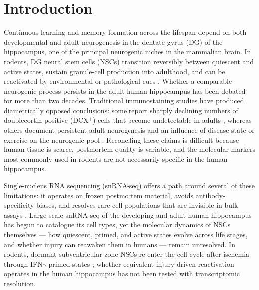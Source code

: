 
\section{Introduction}

Continuous learning and memory formation across the lifespan depend on both developmental and adult neurogenesis in the dentate gyrus (DG) of the hippocampus, one of the principal neurogenic niches in the mammalian brain. In rodents, DG neural stem cells (NSCs) transition reversibly between quiescent and active states, sustain granule-cell production into adulthood, and can be reactivated by environmental or pathological cues \cite{encinas2011division,obernier2019neural,urban2019quiescence}. Whether a comparable neurogenic process persists in the adult human hippocampus has been debated for more than two decades. Traditional immunostaining studies have produced diametrically opposed conclusions: some report sharply declining numbers of doublecortin-positive (DCX$^{+}$) cells that become undetectable in adults \cite{sorrells2018human,cipriani2018hippocampal,franjic2022transcriptomic}, whereas others document persistent adult neurogenesis and an influence of disease state or exercise on the neurogenic pool \cite{boldrini2018human,morenojimenez2019adult,tobin2019human,terrerosroncal2021impact}. Reconciling these claims is difficult because human tissue is scarce, postmortem quality is variable, and the molecular markers most commonly used in rodents are not necessarily specific in the human hippocampus.

Single-nucleus RNA sequencing (snRNA-seq) offers a path around several of these limitations: it operates on frozen postmortem material, avoids antibody-specificity biases, and resolves rare cell populations that are invisible in bulk assays \cite{habib2017massively}. Large-scale snRNA-seq of the developing \cite{zhong2020decoding} and adult \cite{franjic2022transcriptomic,ayhan2021resolving} human hippocampus has begun to catalogue its cell types, yet the molecular dynamics of NSCs themselves --- how quiescent, primed, and active states evolve across life stages, and whether injury can reawaken them in humans --- remain unresolved. In rodents, dormant subventricular-zone NSCs re-enter the cell cycle after ischemia through IFN$\gamma$-primed states \cite{llorensbobadilla2015single}; whether equivalent injury-driven reactivation operates in the human hippocampus has not been tested with transcriptomic resolution.

